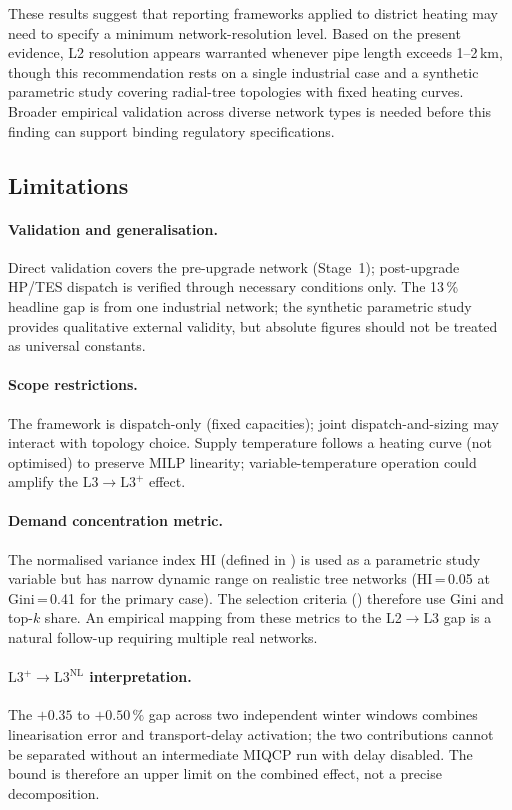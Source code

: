 \documentclass[a4paper,fleqn]{cas-dc}
\newcommand{\Lplus}{\mathrm{L3}^{+}}
\newcommand{\Lnl}{\mathrm{L3}^{\mathrm{NL}}}
\begin{document}
These results suggest that  reporting frameworks applied
to district heating may need to specify a minimum
network-resolution level. Based on the present evidence, L2
resolution appears warranted whenever pipe length exceeds
1--2\,km, though this recommendation rests on a single industrial
case and a synthetic parametric study covering radial-tree topologies with
fixed heating curves. Broader empirical validation across diverse
network types is needed before this finding can support binding
regulatory specifications.

\subsection{Limitations}
\label{sec:discussion_limitations}

\paragraph{Validation and generalisation.}
Direct validation covers the pre-upgrade network (Stage~1);
post-upgrade HP/TES dispatch is verified through necessary
conditions only. The 13\,\% headline gap is from one industrial
network; the synthetic parametric study provides qualitative external validity,
but absolute figures should not be treated as universal constants.

\paragraph{Scope restrictions.}
The framework is dispatch-only (fixed capacities); joint
dispatch-and-sizing may interact with topology choice. Supply
temperature follows a heating curve (not optimised) to preserve
MILP linearity; variable-temperature operation could amplify the
L3$\to\Lplus$ effect.

\paragraph{Demand concentration metric.}
The normalised variance index HI (defined in
) is used as a parametric study variable but has
narrow dynamic range on realistic tree networks (HI\,=\,0.05 at
Gini\,=\,0.41 for the primary case). The selection criteria
() therefore use Gini and top-$k$ share. An
empirical mapping from these metrics to the L2$\to$L3 gap is a
natural follow-up requiring multiple real networks.

\paragraph{$\Lplus\!\to\!\Lnl$ interpretation.}
The $+0.35$ to $+0.50\,\%$ gap across two independent winter
windows combines linearisation error and transport-delay
activation; the two contributions cannot be separated without an
intermediate MIQCP run with delay disabled. The bound is
therefore an upper limit on the combined effect, not a precise
decomposition.
\end{document}
